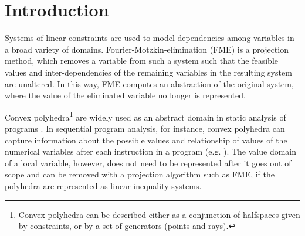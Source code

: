 \section{Introduction}
Systems of linear constraints are used to model dependencies among variables in a broad variety of domains. 
Fourier-Motzkin-elimination (FME) is a projection method, which removes a variable from such a system such that the feasible values and inter-dependencies of the remaining variables in the resulting system are unaltered. In this way, FME computes an abstraction of the original system, where the value of the eliminated variable no longer is represented.


Convex polyhedra\footnote{Convex polyhedra can be described either as a conjunction of halfspaces given by constraints, or by a set of generators (points and rays).} are widely used as an abstract domain in static analysis of programs \cite{cousot78}.
In sequential program analysis, for instance, convex polyhedra can capture information about the possible values and relationship of values of the numerical variables after each instruction in a program ({e.g. \cite{fouilhe}}). The value domain of a local variable, however, does not need to be represented after it goes out of scope and can be removed with a projection algorithm such as FME, if the polyhedra are represented as linear inequality systems. 

